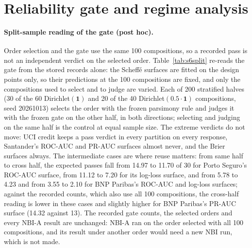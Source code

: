 \documentclass[11pt,a4paper]{article}
\begin{document}
\section{Reliability gate and regime analysis}
\label{sec:s6}





\paragraph{Split-sample reading of the gate (post hoc).} Order selection and the gate use the same 100 compositions,
so a recorded pass is not an independent verdict on the selected order. Table~\ref{tab:s6split} re-reads the gate
from the stored records alone: the Scheff\'e surfaces are fitted on the design points only, so their predictions at
the 100 compositions are fixed, and only the compositions used to select and to judge are varied. Each of 200
stratified halves (30 of the 60 Dirichlet$(\mathbf{1})$ and 20 of the 40 Dirichlet$(0.5\cdot\mathbf{1})$
compositions, seed 20261013) selects the order with the frozen parsimony rule and judges it with the frozen gate on
the other half, in both directions; selecting and judging on the same half is the control at equal sample size. The
extreme verdicts do not move: UCI credit keeps a pass verdict in every partition on every response, Santander's ROC-AUC and PR-AUC
surfaces almost never, and the Brier surfaces always. The intermediate cases are where reuse matters: from same half
to cross half, the expected passes fall from 14.97 to 11.70 of 30 for Porto Seguro's ROC-AUC surface, from 11.12 to
7.20 for its log-loss surface, and from 5.78 to 4.23 and from 3.55 to 2.10 for BNP Paribas's ROC-AUC and log-loss
surfaces; against the recorded counts, which also use all 100 compositions, the cross-half reading is lower in
these cases and slightly higher for BNP Paribas's PR-AUC surface (14.32 against 13). The recorded gate counts, the selected
orders and every NBI-A result are unchanged: NBI-A ran on the order selected with all 100 compositions, and its
result under another order would need a new NBI run, which is not made.
\end{document}
